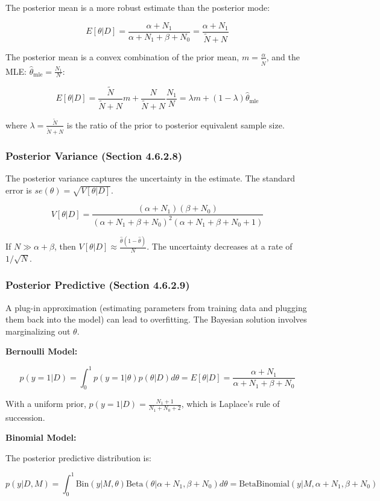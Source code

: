 \documentclass{article}
\begin{document}
The posterior mean is a more robust estimate than the posterior mode:

$$
E[\theta|D] = \frac{\alpha + N_1}{\alpha + N_1 + \beta + N_0} = \frac{\alpha + N_1}{\tilde{N} + N}
$$

The posterior mean is a convex combination of the prior mean, $m = \frac{\alpha}{\tilde{N}}$, and the MLE: $\hat{\theta}_{\text{mle}} = \frac{N_1}{N}$:

$$
E[\theta|D] = \frac{\tilde{N}}{\tilde{N} + N}m + \frac{N}{\tilde{N} + N}\frac{N_1}{N} = \lambda m + (1 - \lambda)\hat{\theta}_{\text{mle}}
$$

where $\lambda = \frac{\tilde{N}}{\tilde{N} + N}$ is the ratio of the prior to posterior equivalent sample size.

\subsubsection{Posterior Variance (Section 4.6.2.8)}

The posterior variance captures the uncertainty in the estimate. The standard error is $se(\theta) = \sqrt{V[\theta|D]}$.

$$
V[\theta|D] = \frac{(\alpha + N_1)(\beta + N_0)}{(\alpha + N_1 + \beta + N_0)^2 (\alpha + N_1 + \beta + N_0 + 1)}
$$

If $N \gg \alpha + \beta$, then $V[\theta|D] \approx \frac{\hat{\theta}(1 - \hat{\theta})}{N}$.  The uncertainty decreases at a rate of $1/\sqrt{N}$.

\subsubsection{Posterior Predictive (Section 4.6.2.9)}

A plug-in approximation (estimating parameters from training data and plugging them back into the model) can lead to overfitting. The Bayesian solution involves marginalizing out $\theta$.

\textbf{Bernoulli Model:}

$$
p(y = 1|D) = \int_{0}^{1} p(y = 1|\theta) p(\theta|D) d\theta = E[\theta|D] = \frac{\alpha + N_1}{\alpha + N_1 + \beta + N_0}
$$

With a uniform prior, $p(y = 1|D) = \frac{N_1 + 1}{N_1 + N_0 + 2}$, which is Laplace's rule of succession.

\textbf{Binomial Model:}

The posterior predictive distribution is:

$$
p(y|D, M) = \int_{0}^{1} \text{Bin}(y|M, \theta) \text{Beta}(\theta|\alpha+N_1, \beta+N_0) d\theta = \text{BetaBinomial}(y|M, \alpha+N_1, \beta+N_0)
$$
\end{document}
